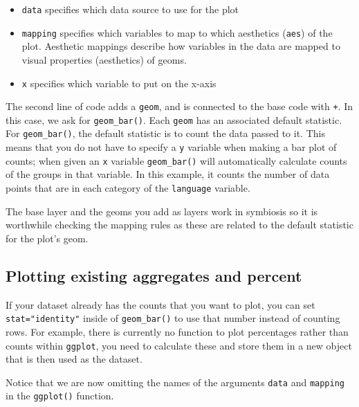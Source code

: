 \documentclass[
  english,
  doc,floatsintext]{apa6}
\begin{document}
\begin{itemize}
\item
  \texttt{data} specifies which data source to use for the plot
\item
  \texttt{mapping} specifies which variables to map to which aesthetics (\texttt{aes}) of the plot. Aesthetic mappings describe how variables in the data are mapped to visual properties (aesthetics) of geoms.
\item
  \texttt{x} specifies which variable to put on the x-axis
\end{itemize}

The second line of code adds a \texttt{geom}, and is connected to the base code with \texttt{+}. In this case, we ask for \texttt{geom\_bar()}. Each \texttt{geom} has an associated default statistic. For \texttt{geom\_bar()}, the default statistic is to count the data passed to it. This means that you do not have to specify a \texttt{y} variable when making a bar plot of counts; when given an \texttt{x} variable \texttt{geom\_bar()} will automatically calculate counts of the groups in that variable. In this example, it counts the number of data points that are in each category of the \texttt{language} variable.

The base layer and the geoms you add as layers work in symbiosis so it is worthwhile checking the mapping rules as these are related to the default statistic for the plot's geom.

\hypertarget{plotting-existing-aggregates-and-percent}{%
\subsection{Plotting existing aggregates and percent}\label{plotting-existing-aggregates-and-percent}}

If your dataset already has the counts that you want to plot, you can set \texttt{stat="identity"} inside of \texttt{geom\_bar()} to use that number instead of counting rows. For example, there is currently no function to plot percentages rather than counts within \texttt{ggplot}, you need to calculate these and store them in a new object that is then used as the dataset.

Notice that we are now omitting the names of the arguments \texttt{data} and \texttt{mapping} in the \texttt{ggplot()} function.
\end{document}
